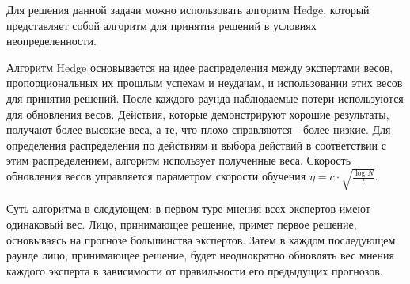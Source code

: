 \documentclass[a4paper,14pt]{extarticle}
\begin{document}
Для решения данной задачи можно использовать алгоритм Hedge, который представляет собой
алгоритм для принятия решений в условиях неопределенности.

Алгоритм Hedge основывается на идее распределения между экспертами весов, пропорциональных их прошлым успехам и неудачам, и использовании этих весов для принятия решений. После каждого раунда наблюдаемые потери используются для обновления весов. Действия, которые демонстрируют хорошие результаты, получают более высокие веса, а те, что плохо справляются - более низкие. Для определения распределения по действиям и выбора действий в соответствии с этим распределением, алгоритм использует полученные веса. Скорость обновления весов управляется параметром скорости обучения $\eta = c \cdot \sqrt{\frac{\log N}{t}}$.

Суть алгоритма в следующем: в первом туре мнения всех экспертов имеют одинаковый вес. Лицо, принимающее решение, примет первое решение, основываясь на прогнозе большинства экспертов. Затем в каждом последующем раунде лицо, принимающее решение, будет неоднократно обновлять вес мнения каждого эксперта в зависимости от правильности его предыдущих прогнозов.
\end{document}

